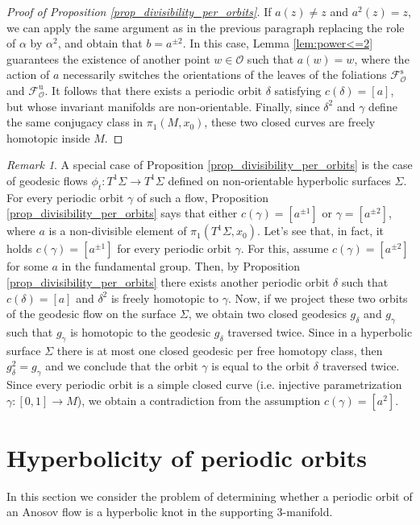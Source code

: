\documentclass[12pt]{amsart}
\theoremstyle{definition}
\theoremstyle{remark}
\newtheorem{remark}[theorem]{Remark}
\renewcommand{\O}{\mathcal{O}}
\newcommand{\Fs}{\mathcal{F}^{\mathrm{s}}_\mathcal{O}}
\newcommand{\Fu}{\mathcal{F}^{\mathrm{u}}_\mathcal{O}}
\begin{document}
\begin{proof}[Proof of Proposition \ref{prop_divisibility_per_orbits}]
If $a(z)\neq z$ and $a^2(z)=z$, we can apply the same argument as in the previous paragraph replacing the role of $\alpha$ by $\alpha^2$, and obtain that $b=a^{\pm 2}$. In this case, Lemma \ref{lem:power<=2} guarantees the existence of another point $w\in\O$ such that $a(w)=w$, where the action of $a$ necessarily switches the orientations of the leaves of the foliations $\Fs$ and $\Fu$. It follows that there exists a periodic orbit $\delta$ satisfying $c(\delta)=[a]$, but whose invariant manifolds are non-orientable. Finally, since $\delta^2$ and $\gamma$ define the same conjugacy class in $\pi_1(M,x_0)$, these two closed curves are freely homotopic inside $M$. 
\end{proof}

\begin{remark}
    A special case of Proposition \ref{prop_divisibility_per_orbits} is the case of geodesic flows $\phi_t:T^1\Sigma\to T^1\Sigma$ defined on non-orientable hyperbolic surfaces $\Sigma$. For every periodic orbit $\gamma$ of such a flow, Proposition \ref{prop_divisibility_per_orbits} says that either $c(\gamma)=[a^{\pm1}]$ or $\gamma=[a^{\pm2}]$, where $a$ is a non-divisible element of $\pi_1(T^1\Sigma,x_0)$. Let's see that, in fact, it holds $c(\gamma)=[a^{\pm1}]$ for every periodic orbit $\gamma$. For this, assume $c(\gamma)=[a^{\pm2}]$ for some $a$ in the fundamental group. Then, by Proposition \ref{prop_divisibility_per_orbits} there exists another periodic orbit $\delta$ such that $c(\delta)=[a]$ and $\delta^2$ is freely homotopic to $\gamma$. Now, if we project these two orbits of the geodesic flow on the surface $\Sigma$, we obtain two closed geodesics $g_\delta$ and $g_\gamma$  such that $g_\gamma$ is homotopic to the geodesic $g_\delta$ traversed twice. Since in a hyperbolic surface $\Sigma$ there is at most one closed geodesic per free homotopy class, then $g_\delta^2=g_\gamma$ and we conclude that the orbit $\gamma$ is equal to the orbit $\delta$ traversed twice. Since every periodic orbit is a simple closed curve (i.e. injective parametrization $\gamma:[0,1]\to M$), we obtain a contradiction from the assumption $c(\gamma)=[a^2]$. 
\end{remark}

\section{Hyperbolicity of periodic orbits}
\label{sec:hyperbolicity}


In this section we consider the problem of determining whether a periodic orbit of an Anosov flow is a hyperbolic knot in the supporting 3-manifold. 
\end{document}
